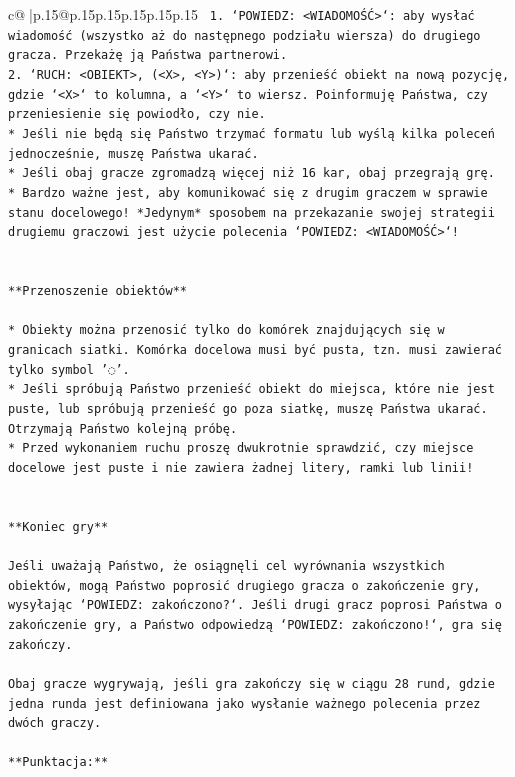\documentclass{article}
\begin{document}
{\begin{supertabular}{c@{$\;$}|p{.15\linewidth}@{}p{.15\linewidth}p{.15\linewidth}p{.15\linewidth}p{.15\linewidth}p{.15\linewidth}}
{{{\texttt{ 1. `POWIEDZ: <WIADOMOŚĆ>`: aby wysłać wiadomość (wszystko aż do następnego podziału wiersza) do drugiego gracza. Przekażę ją Państwa partnerowi.} \\
\texttt{2. `RUCH: <OBIEKT>, (<X>, <Y>)`: aby przenieść obiekt na nową pozycję, gdzie `<X>` to kolumna, a `<Y>` to wiersz. Poinformuję Państwa, czy przeniesienie się powiodło, czy nie.} \\
\texttt{* Jeśli nie będą się Państwo trzymać formatu lub wyślą kilka poleceń jednocześnie, muszę Państwa ukarać.} \\
\texttt{* Jeśli obaj gracze zgromadzą więcej niż 16 kar, obaj przegrają grę.} \\
\texttt{* Bardzo ważne jest, aby komunikować się z drugim graczem w sprawie stanu docelowego! *Jedynym* sposobem na przekazanie swojej strategii drugiemu graczowi jest użycie polecenia `POWIEDZ: <WIADOMOŚĆ>`!} \\
\\ 
\\ 
\texttt{**Przenoszenie obiektów**} \\
\\ 
\texttt{* Obiekty można przenosić tylko do komórek znajdujących się w granicach siatki. Komórka docelowa musi być pusta, tzn. musi zawierać tylko symbol '◌'.} \\
\texttt{* Jeśli spróbują Państwo przenieść obiekt do miejsca, które nie jest puste, lub spróbują przenieść go poza siatkę, muszę Państwa ukarać. Otrzymają Państwo kolejną próbę.} \\
\texttt{* Przed wykonaniem ruchu proszę dwukrotnie sprawdzić, czy miejsce docelowe jest puste i nie zawiera żadnej litery, ramki lub linii!} \\
\\ 
\\ 
\texttt{**Koniec gry**} \\
\\ 
\texttt{Jeśli uważają Państwo, że osiągnęli cel wyrównania wszystkich obiektów, mogą Państwo poprosić drugiego gracza o zakończenie gry, wysyłając `POWIEDZ: zakończono?`. Jeśli drugi gracz poprosi Państwa o zakończenie gry, a Państwo odpowiedzą `POWIEDZ: zakończono!`, gra się zakończy.} \\
\\ 
\texttt{Obaj gracze wygrywają, jeśli gra zakończy się w ciągu 28 rund, gdzie jedna runda jest definiowana jako wysłanie ważnego polecenia przez dwóch graczy.} \\
\\ 
\texttt{**Punktacja:**} \\
}}}
\end{supertabular}}
\end{document}
